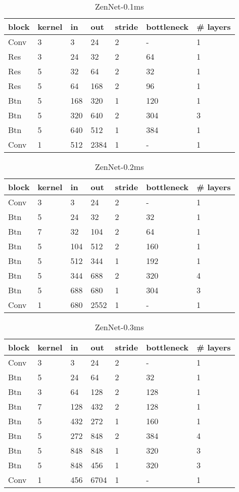\documentclass{article}
\providecommand{\tabularnewline}{\\}
\providecommand{\tabularnewline}{\\}
\begin{document}
\begin{table}[!h]
 \begin{center}
   \begin{tabular}{lllllll}
     \toprule 
     block & kernel & in & out & stride & bottleneck & \# layers\tabularnewline
     \midrule
     \midrule
     Conv & 3 & 3 & 24 & 2 & - & 1\tabularnewline
     \midrule
     Res & 3 & 24 & 32 & 2 & 64 & 1\tabularnewline
     \midrule
     Res & 5 & 32 & 64 & 2 & 32 & 1\tabularnewline
     \midrule
     Res & 5 & 64 & 168 & 2 & 96 & 1\tabularnewline
     \midrule
     Btn & 5 & 168 & 320 & 1 & 120 & 1\tabularnewline
     \midrule
     Btn & 5 & 320 & 640 & 2 & 304 & 3\tabularnewline
     \midrule
     Btn & 5 & 640 & 512 & 1 & 384 & 1\tabularnewline
     \midrule
     Conv & 1 & 512 & 2384 & 1 & - & 1\tabularnewline
     \bottomrule
     \end{tabular}
 \end{center}
 \caption{ZenNet-0.1ms}
 \label{tab:struct-ZenNet-0.1ms}
\end{table}

\begin{table}[!h]
 \begin{center}
   \begin{tabular}{lllllll}
     \toprule 
     block & kernel & in & out & stride & bottleneck & \# layers\tabularnewline
     \midrule
     \midrule
     Conv & 3 & 3 & 24 & 2 & - & 1\tabularnewline
     \midrule
     Btn & 5 & 24 & 32 & 2 & 32 & 1\tabularnewline
     \midrule
     Btn & 7 & 32 & 104 & 2 & 64 & 1\tabularnewline
     \midrule
     Btn & 5 & 104 & 512 & 2 & 160 & 1\tabularnewline
     \midrule
     Btn & 5 & 512 & 344 & 1 & 192 & 1\tabularnewline
     \midrule
     Btn & 5 & 344 & 688 & 2 & 320 & 4\tabularnewline
     \midrule
     Btn & 5 & 688 & 680 & 1 & 304 & 3\tabularnewline
     \midrule
     Conv & 1 & 680 & 2552 & 1 & - & 1\tabularnewline
     \bottomrule
     \end{tabular}
 \end{center}
 \caption{ZenNet-0.2ms}
 \label{tab:struct-ZenNet-0.2ms}
\end{table}

\begin{table}[!h]
 \begin{center}
   \begin{tabular}{lllllll}
     \toprule 
     block & kernel & in & out & stride & bottleneck & \# layers\tabularnewline
     \midrule
     \midrule
Conv & 3 & 3 & 24 & 2 & - & 1\tabularnewline
\midrule
Btn & 5 & 24 & 64 & 2 & 32 & 1\tabularnewline
\midrule
Btn & 3 & 64 & 128 & 2 & 128 & 1\tabularnewline
\midrule
Btn & 7 & 128 & 432 & 2 & 128 & 1\tabularnewline
\midrule
Btn & 5 & 432 & 272 & 1 & 160 & 1\tabularnewline
\midrule
Btn & 5 & 272 & 848 & 2 & 384 & 4\tabularnewline
\midrule
Btn & 5 & 848 & 848 & 1 & 320 & 3\tabularnewline
\midrule
Btn & 5 & 848 & 456 & 1 & 320 & 3\tabularnewline
\midrule
Conv & 1 & 456 & 6704 & 1 & - & 1\tabularnewline
     \bottomrule
     \end{tabular}
 \end{center}
 \caption{ZenNet-0.3ms}
 \label{tab:struct-ZenNet-0.3ms}
\end{table}
\end{document}
